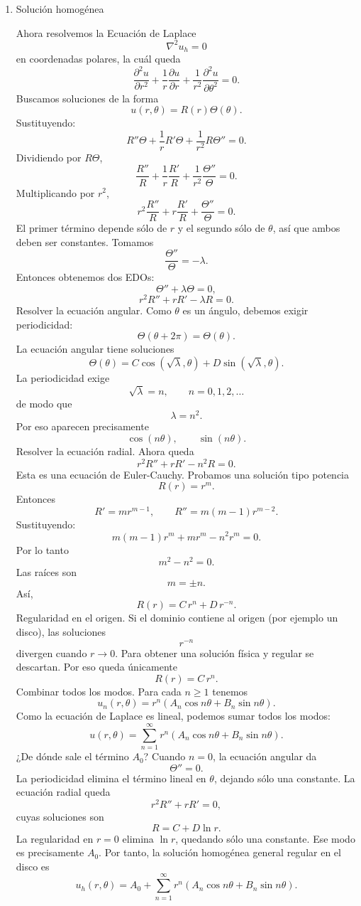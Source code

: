 \documentclass[11pt,spanish]{article}
\begin{document}
\begin{enumerate}
\item Solución homogénea

Ahora resolvemos la Ecuación de Laplace
$$
\nabla^2 u_h=0
$$
en coordenadas polares, la cu\'al queda
$$
\frac{\partial^2 u}{\partial r^2}
+\frac1r\frac{\partial u}{\partial r}
+\frac1{r^2}\frac{\partial^2 u}{\partial \theta^2}
=0.
$$
Buscamos soluciones de la forma
$$
u(r,\theta)=R(r)\Theta(\theta).
$$
Sustituyendo:
$$
R''\Theta+\frac1rR'\Theta+\frac1{r^2}R\Theta''=0.
$$
Dividiendo por $R\Theta$,
$$
\frac{R''}{R}
+\frac1r\frac{R'}{R}
+\frac1{r^2}\frac{\Theta''}{\Theta}
=0.
$$
Multiplicando por $r^2$,
$$
r^2\frac{R''}{R}
+r\frac{R'}{R}
+\frac{\Theta''}{\Theta}
=0.
$$
El primer término depende sólo de $r$ y el segundo sólo de $\theta$, así que ambos deben ser constantes.
Tomamos
$$
\frac{\Theta''}{\Theta}=-\lambda.
$$
Entonces obtenemos dos EDOs:
$$
\Theta''+\lambda\Theta=0,
$$
$$
r^2R''+rR'-\lambda R=0.
$$
Resolver la ecuación angular.
Como $\theta$ es un ángulo, debemos exigir periodicidad:
$$
\Theta(\theta+2\pi)=\Theta(\theta).
$$
La ecuación angular tiene soluciones
$$
\Theta(\theta)
=
C\cos(\sqrt{\lambda},\theta)
+
D\sin(\sqrt{\lambda},\theta).
$$
La periodicidad exige
$$
\sqrt{\lambda}=n,
\qquad
n=0,1,2,\ldots
$$
de modo que
$$
\lambda=n^2.
$$
Por eso aparecen precisamente
$$
\cos(n\theta),\qquad \sin(n\theta).
$$
Resolver la ecuación radial.
Ahora queda
$$
r^2R''+rR'-n^2R=0.
$$
Esta es una ecuación de Euler-Cauchy.
Probamos una solución tipo potencia
$$
R(r)=r^m.
$$
Entonces
$$
R'=mr^{m-1},
\qquad
R''=m(m-1)r^{m-2}.
$$
Sustituyendo:
$$
m(m-1)r^m
+
mr^m
-
n^2r^m
=0.
$$
Por lo tanto
$$
m^2-n^2=0.
$$
Las raíces son
$$
m=\pm n.
$$
Así,
$$
R(r)=C\,r^n+D\,r^{-n}.
$$
Regularidad en el origen.
Si el dominio contiene al origen (por ejemplo un disco), las soluciones
$$
r^{-n}
$$
divergen cuando $r\to0$.
Para obtener una solución física y regular se descartan.
Por eso queda únicamente
$$
R(r)=C\,r^n.
$$
Combinar todos los modos.
Para cada $n\ge 1$ tenemos
$$
u_n(r,\theta)
=
r^n
\left(
A_n\cos n\theta
+
B_n\sin n\theta
\right).
$$
Como la ecuación de Laplace es lineal, podemos sumar todos los modos:
$$
u(r,\theta)
=
\sum_{n=1}^{\infty}
r^n
\left(
A_n\cos n\theta
+
B_n\sin n\theta
\right).
$$
¿De dónde sale el término $A_0$?
Cuando $n=0$, la ecuación angular da
$$
\Theta''=0.
$$
La periodicidad elimina el término lineal en $\theta$, dejando sólo una constante.
La ecuación radial queda
$$
r^2R''+rR'=0,
$$
cuyas soluciones son
$$
R=C+D\ln r.
$$
La regularidad en $r=0$ elimina $\ln r$, quedando sólo una constante.
Ese modo es precisamente $A_0$.
Por tanto, la solución homogénea general regular en el disco es
$$
u_h(r,\theta)=
A_0+
\sum_{n=1}^{\infty}
r^n
\left(
A_n\cos n\theta
+
B_n\sin n\theta
\right).
$$


\end{enumerate}
\end{document}
